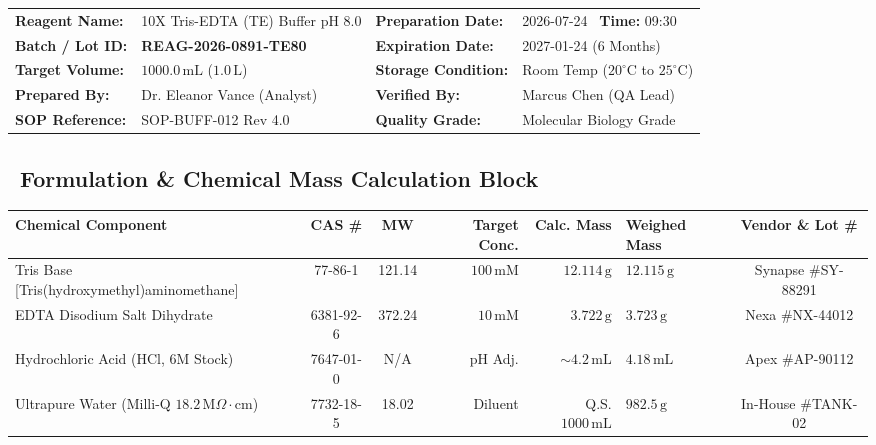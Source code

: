 \documentclass[10pt,a4paper]{article}
\begin{document}
\begin{tcolorbox}[labcardteal, title={\small\bfseries\color{white}\faFile\ SECTION 1: MASTER REAGENT PREPARATION RECORD -- BATCH \# REAG-2026-0891}, coltitle=white, colbacktitle=labteal]

  \scriptsize
  \begin{tabularx}{\textwidth}{@{}lXlX@{}}
    \textbf{Reagent Name:} & 10X Tris-EDTA (TE) Buffer pH 8.0 & \textbf{Preparation Date:} & 2026-07-24 \ \textbf{Time:} 09:30 \\
    \textbf{Batch / Lot ID:} & \textbf{REAG-2026-0891-TE80} & \textbf{Expiration Date:} & 2027-01-24 (6 Months) \\
    \textbf{Target Volume:} & $1000.0\,\text{mL}$ ($1.0\,\text{L}$) & \textbf{Storage Condition:} & Room Temp ($20^\circ\text{C}$ to $25^\circ\text{C}$) \\
    \textbf{Prepared By:} & Dr. Eleanor Vance (Analyst) & \textbf{Verified By:} & Marcus Chen (QA Lead) \\
    \textbf{SOP Reference:} & SOP-BUFF-012 Rev 4.0 & \textbf{Quality Grade:} & Molecular Biology Grade \\
    \bottomrule
  \end{tabularx}

  \vspace{3pt}
  {\subsection*{{\small\bfseries\color{labnavy}\faFlask\ Formulation \& Chemical Mass Calculation Block}}}
  \vspace{-5pt}

  \begin{tabularx}{\textwidth}{@{}Xccrr>{\raggedright\arraybackslash}Xc@{}}
    \toprule
    \rowcolor{labnavy!10}
    \textbf{Chemical Component} & \textbf{CAS \#} & \textbf{MW} & \textbf{Target Conc.} & \textbf{Calc. Mass} & \textbf{Weighed Mass} & \textbf{Vendor \& Lot \#} \\
    \midrule
    Tris Base [Tris(hydroxymethyl)aminomethane] & 77-86-1 & 121.14 & $100\,\text{mM}$ & $12.114\,\text{g}$ & $12.115\,\text{g}$ & Synapse \#SY-88291 \\
    EDTA Disodium Salt Dihydrate & 6381-92-6 & 372.24 & $10\,\text{mM}$ & $3.722\,\text{g}$ & $3.723\,\text{g}$ & Nexa \#NX-44012 \\
    Hydrochloric Acid (HCl, 6M Stock) & 7647-01-0 & N/A & pH Adj. & $\sim 4.2\,\text{mL}$ & $4.18\,\text{mL}$ & Apex \#AP-90112 \\
    Ultrapure Water (Milli-Q $18.2\,\text{M}\Omega\cdot\text{cm}$) & 7732-18-5 & 18.02 & Diluent & Q.S. $1000\,\text{mL}$ & $982.5\,\text{g}$ & In-House \#TANK-02 \\
    \bottomrule
  \end{tabularx}


\end{tcolorbox}
\end{document}
